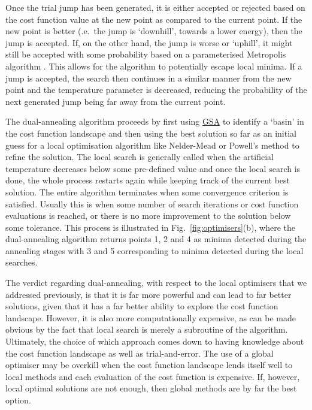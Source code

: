 \documentclass[a4paper,oneside,11pt]{book}
\newcommand{\acrref}[1]{\hyperref[acr:#1]{#1}}
\begin{document}
Once the trial jump has been generated, it is either accepted or rejected based on the cost function value at the new point as compared to the current point. If the new point is better (\@i.e.~the jump is `downhill', towards a lower energy), then the jump is accepted. If, on the other hand, the jump is worse or `uphill', it might still be accepted with some probability based on a parameterised Metropolis algorithm \cite{chib_understanding_1995}. This allows for the algorithm to potentially escape local minima. If a jump is accepted, the search then continues in a similar manner from the new point and the temperature parameter is decreased, reducing the probability of the next generated jump being far away from the current point.

The dual-annealing algorithm proceeds by first using \acrref{GSA} to identify a `basin' in the cost function landscape and then using the best solution so far as an initial guess for a local optimisation algorithm like Nelder-Mead or Powell's method to refine the solution. The local search is generally called when the artificial temperature decreases below some pre-defined value and once the local search is done, the whole process restarts again while keeping track of the current best solution. The entire algorithm terminates when some convergence criterion is satisfied. Usually this is when some number of search iterations or cost function evaluations is reached, or there is no more improvement to the solution below some tolerance. This process is illustrated in Fig.~\ref{fig:optimisers}(b), where the dual-annealing algorithm returns points 1, 2 and 4 as minima detected during the annealing stages with 3 and 5 corresponding to minima detected during the local searches. 

The verdict regarding dual-annealing, with respect to the local optimisers that we addressed previously, is that it is far more powerful and can lead to far better solutions, given that it has a far better ability to explore the cost function landscape. However, it is also more computationally expensive, as can be made obvious by the fact that local search is merely a subroutine of the algorithm. Ultimately, the choice of which approach comes down to having knowledge about the cost function landscape as well as trial-and-error. The use of a global optimiser may be overkill when the cost function landscape lends itself well to local methods and each evaluation of the cost function is expensive. If, however, local optimal solutions are not enough, then global methods are by far the best option.
\end{document}

